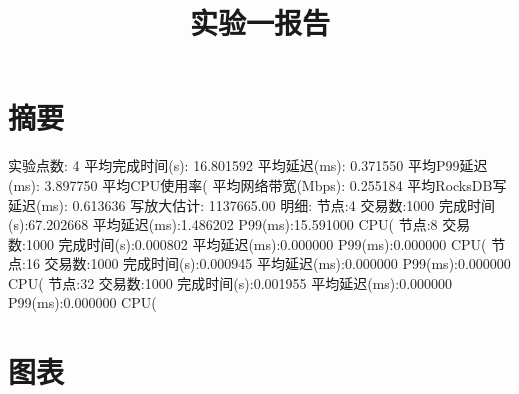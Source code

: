 \documentclass{ctexart}
\title{实验一报告}
\date{}
\begin{document}
\maketitle
\section*{摘要}
实验点数: 4
平均完成时间(s): 16.801592
平均延迟(ms): 0.371550
平均P99延迟(ms): 3.897750
平均CPU使用率(%
平均网络带宽(Mbps): 0.255184
平均RocksDB写延迟(ms): 0.613636
写放大估计: 1137665.00
明细:
节点:4 交易数:1000 完成时间(s):67.202668 平均延迟(ms):1.486202 P99(ms):15.591000 CPU(%
节点:8 交易数:1000 完成时间(s):0.000802 平均延迟(ms):0.000000 P99(ms):0.000000 CPU(%
节点:16 交易数:1000 完成时间(s):0.000945 平均延迟(ms):0.000000 P99(ms):0.000000 CPU(%
节点:32 交易数:1000 完成时间(s):0.001955 平均延迟(ms):0.000000 P99(ms):0.000000 CPU(%
\section*{图表}
\end{document}
